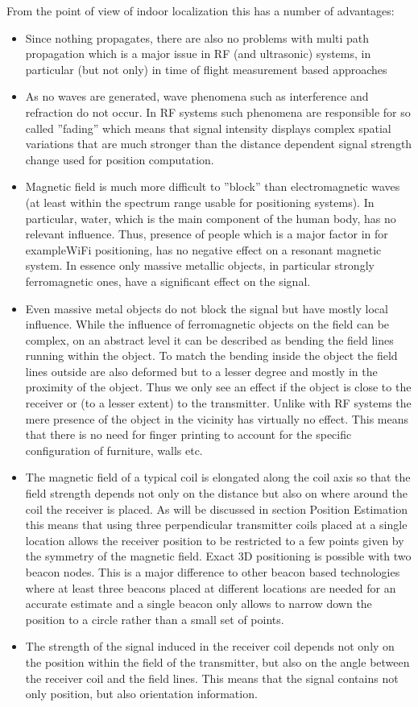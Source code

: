 \documentclass[a4paper,11pt]{article}
\begin{document}
From the point of view of indoor localization this has a number
of advantages:
\begin{itemize}
\item Since nothing propagates, there are also no problems with
multi path propagation which is a major issue in RF (and
ultrasonic) systems, in particular (but not only) in time of
flight measurement based approaches
\item As no waves are generated, wave phenomena such as interference
and refraction do not occur. In RF systems such
phenomena are responsible for so called ”fading” which
means that signal intensity displays complex spatial variations
that are much stronger than the distance dependent
signal strength change used for position computation.
\item Magnetic field is much more difficult to ”block” than electromagnetic
waves (at least within the spectrum range usable
for positioning systems). In particular, water, which
is the main component of the human body, has no relevant
influence. Thus, presence of people which is a major
factor in for exampleWiFi positioning, has no negative effect
on a resonant magnetic system. In essence only massive
metallic objects, in particular strongly ferromagnetic
ones, have a significant effect on the signal.
\item Even massive metal objects do not block the signal but
have mostly local influence. While the influence of ferromagnetic
objects on the field can be complex, on an abstract
level it can be described as bending the field lines
running within the object. To match the bending inside
the object the field lines outside are also deformed but to
a lesser degree and mostly in the proximity of the object.
Thus we only see an effect if the object is close to the receiver
or (to a lesser extent) to the transmitter. Unlike with
RF systems the mere presence of the object in the vicinity
has virtually no effect. This means that there is no need
for finger printing to account for the specific configuration
of furniture, walls etc.
\item The magnetic field of a typical coil is elongated along the
coil axis so that the field strength depends not only on the
distance but also on where around the coil the receiver is
placed. As will be discussed in section Position Estimation
this means that using three perpendicular transmitter
coils placed at a single location allows the receiver position
to be restricted to a few points given by the symmetry
of the magnetic field. Exact 3D positioning is possible
with two beacon nodes. This is a major difference to other
beacon based technologies where at least three beacons
placed at different locations are needed for an accurate
estimate and a single beacon only allows to narrow down
the position to a circle rather than a small set of points.
\item The strength of the signal induced in the receiver coil depends
not only on the position within the field of the transmitter,
but also on the angle between the receiver coil and
the field lines. This means that the signal contains not
only position, but also orientation information.
\end{itemize}
\end{document}
